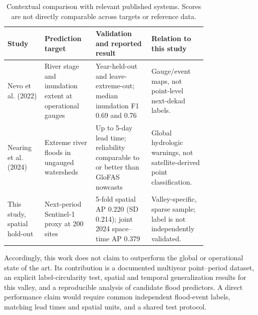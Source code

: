 \documentclass[pdflatex,sn-mathphys,Numbered]{sn-jnl}
\begin{document}
\begin{table}[t]
\centering
\caption{Contextual comparison with relevant published systems. Scores are not directly comparable across targets or reference data.}
\label{tab:sota}
\begin{tabular}{p{0.16\linewidth}p{0.22\linewidth}p{0.24\linewidth}p{0.17\linewidth}}
\toprule
Study & Prediction target & Validation and reported result & Relation to this study \\
\midrule
Nevo et al. (2022) & River stage and inundation extent at operational gauges & Year-held-out and leave-extreme-out; median inundation F1 0.69 and 0.76 & Gauge/event maps, not point-level next-dekad labels. \\
Nearing et al. (2024) & Extreme river floods in ungauged watersheds & Up to 5-day lead time; reliability comparable to or better than GloFAS nowcasts & Global hydrologic warnings, not satellite-derived point classification. \\
This study, spatial hold-out & Next-period Sentinel-1 proxy at 200 sites & 5-fold spatial AP 0.220 (SD 0.214); joint 2024 space--time AP 0.379 & Valley-specific, sparse sample; label is not independently validated. \\
\bottomrule
\end{tabular}
\end{table}

Accordingly, this work does not claim to outperform the global or operational state of the art. Its contribution is a documented multiyear point--period dataset, an explicit label-circularity test, spatial and temporal generalization results for this valley, and a reproducible analysis of candidate flood predictors. A direct performance claim would require common independent flood-event labels, matching lead times and spatial units, and a shared test protocol.
\end{document}
